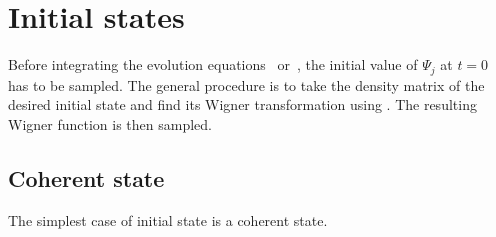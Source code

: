 \section{Initial states}

Before integrating the evolution equations~ or~, the initial value of $\Psi_j$ at $t=0$ has to be sampled.
The general procedure is to take the density matrix of the desired initial state and find its Wigner transformation using .
The resulting Wigner function is then sampled.


\subsection{Coherent state}

The simplest case of initial state is a coherent state.

